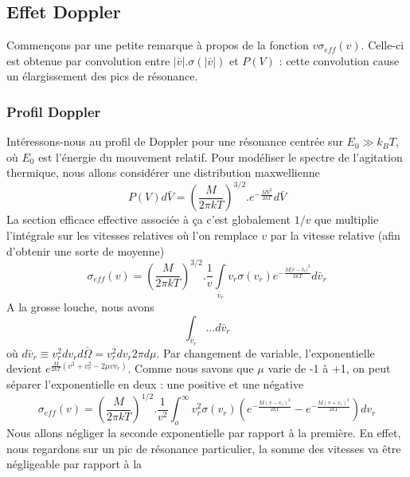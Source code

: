 	\subsection{Effet Doppler}
	Commençons par une petite remarque à propos de la fonction $v{\sigma _{eff}}(v)$. Celle-ci est
	obtenue par convolution entre $|\bar v|.\sigma(|\bar v|)$ et $P(V)$ : cette convolution cause
	un élargissement des pics de résonance.
	
	\subsubsection{Profil Doppler}
	Intéressons-nous au profil de Doppler pour une résonance centrée sur $E_0 \gg k_BT$, où 
	$E_0$ est l'énergie du mouvement relatif. Pour modéliser le spectre de l'agitation thermique, 
	nous allons considérer une distribution maxwellienne
	\begin{equation}
	P(V)d\bar V = {\left( {\frac{M}{{2\pi kT}}} \right)^{3/2}}.{e^{ - \frac{{M{V^2}}}{{2kT}}}}d\bar V
	\end{equation}
	La section efficace effective associée à ça c'est globalement $1/v$ que multiplie l'intégrale
	sur les vitesses relatives où l'on remplace $v$ par la vitesse relative (afin d'obtenir une 
	sorte de moyenne)
	\begin{equation}
	{\sigma _{eff}}(v) = {\left( {\frac{M}{{2\pi kT}}} \right)^{3/2}}.\frac{1}{v}\int\limits_{{{\bar
	 v}_r}}   {v_r}\sigma ({v_r}){e^{ - \frac{{M|\bar v - {{\bar v}_r}{|^2}}}{{2kT}}}}d{\bar v_r}
	\end{equation}
	A la grosse louche, nous avons
	\begin{equation}
	\int _{\bar v_r} \dots d\bar v_r
	\end{equation}
	où $d\bar v_r \equiv v_r^2 dv_r d\bar\Omega = v_r^2dv_r2\pi d\mu$. Par changement de variable, 
	l'exponentielle devient $e^{\frac{M}{2kT}(v^2+v_r^2-2\mu v v_r)}$. Comme nous savons que 
	$\mu$ varie de -1 à +1, on peut séparer l'exponentielle en deux : une positive et une négative
	\begin{equation}
	{\sigma _{eff}}(v) = {\left( {\frac{M}{{2\pi kT}}} \right)^{1/2}}.\frac{1}{{{v^2}}}\int_o^\infty  
	 v_r^2\sigma ({v_r})\left( {{e^{ - \frac{{M{{(v - {v_r})}^2}}}{{2kT}}}} - {e^{ - \frac{{M{{(v +
	 {v_r})}^2}}}{{2kT}}}}} \right)d{v_r}
	\end{equation}
	Nous allons négliger la seconde exponentielle par rapport à la première. En effet, nous regardons
	sur un pic de résonance particulier, la somme des vitesses va être négligeable par rapport à la 
